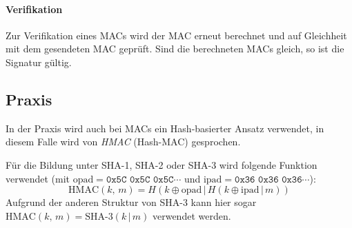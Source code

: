 \documentclass[a4paper, 11pt, accentcolor = tud3b]{tudreport}
\newcommand{\HMAC}{\ensuremath{\textrm{HMAC}}}
\begin{document}
	            \paragraph{Verifikation}
		            Zur Verifikation eines MACs wird der MAC erneut berechnet und auf Gleichheit mit dem gesendeten MAC geprüft. Sind die berechneten MACs gleich, so ist die Signatur gültig.
            
            \subsection{Praxis}
	            In der Praxis wird auch bei MACs ein Hash-basierter Ansatz verwendet, in diesem Falle wird von \textit{HMAC} (Hash-MAC) gesprochen.
	            
	            Für die Bildung unter SHA-1, SHA-2 oder SHA-3 wird folgende Funktion verwendet (mit \( \textrm{opad} = \texttt{0x5C 0x5C 0x5C} \cdots \) und \( \textrm{ipad} = \texttt{0x36 0x36 0x36} \cdots \)):
	            \begin{equation*}
		            \HMAC(k,\, m) = H(k \oplus \textrm{opad} \,\vert\, H(k \oplus \textrm{ipad} \,\vert\, m))
	            \end{equation*}
	            Aufgrund der anderen Struktur von SHA-3 kann hier sogar \( \HMAC(k,\, m) = \textrm{SHA-3}(k \,\vert\, m) \) verwendet werden.
	            
\end{document}
